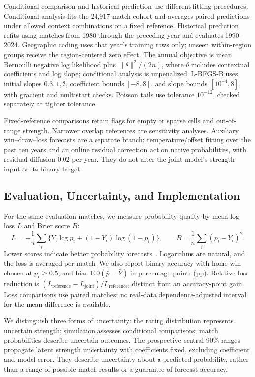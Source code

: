 Conditional comparison and historical prediction use different fitting procedures. Conditional analysis fits the 24,917-match cohort and averages paired predictions under allowed context combinations on a fixed reference. Historical prediction refits using matches from 1980 through the preceding year and evaluates 1990--2024. Geographic coding uses that year's training rows only; unseen within-region groups receive the region-centered zero effect. The annual objective is mean Bernoulli negative log likelihood plus $\|\theta\|^2/(2n)$, where $\theta$ includes contextual coefficients and log slope; conditional analysis is unpenalized. L-BFGS-B uses initial slopes $0.3,1,2$, coefficient bounds $[-8,8]$, and slope bounds $[10^{-4},8]$, with gradient and multistart checks. Poisson tails use tolerance $10^{-12}$, checked separately at tighter tolerance.

Fixed-reference comparisons retain flags for empty or sparse cells and out-of-range strength. Narrower overlap references are sensitivity analyses. Auxiliary win--draw--loss forecasts are a separate branch: temperature/offset fitting over the past ten years and an online residual correction act on native probabilities, with residual diffusion $0.02$ per year. They do not alter the joint model's strength input or its binary target.

\subsection{Evaluation, Uncertainty, and Implementation}
\label{sec:evaluation-method}

For the same evaluation matches, we measure probability quality by mean log loss $L$ and Brier score $B$:
\begin{equation}
 L=-\frac1n\sum_i\{Y_i\log p_i+(1-Y_i)\log(1-p_i)\},\qquad
 B=\frac1n\sum_i(p_i-Y_i)^2.
 \label{eq:probability-scores}
\end{equation}
Lower scores indicate better probability forecasts~\cite{gneiting2007scoring}. Logarithms are natural, and the loss is averaged per match. We also report binary accuracy with home win chosen at $p_i\geq0.5$, and bias $100(\bar p-\bar Y)$ in percentage points (pp). Relative loss reduction is $(L_{\mathrm{reference}}-L_{\mathrm{joint}})/L_{\mathrm{reference}}$, distinct from an accuracy-point gain. Loss comparisons use paired matches; no real-data dependence-adjusted interval for the mean difference is available.

We distinguish three forms of uncertainty: the rating distribution represents uncertain strength; simulation assesses conditional comparisons; match probabilities describe uncertain outcomes. The prospective central 90\% ranges propagate latent strength uncertainty with coefficients fixed, excluding coefficient and model error. They describe uncertainty about a predicted probability, rather than a range of possible match results or a guarantee of forecast accuracy.

